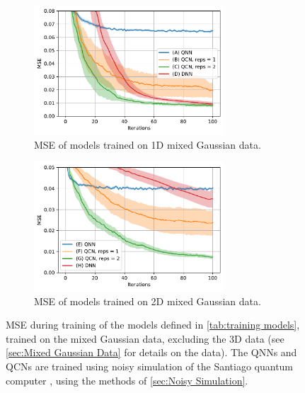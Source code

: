 \begin{figure}[H]
    \centering
    \begin{subfigure}[t]{0.45\textwidth}
        \centering
        \includegraphics[height=1.9in]{latex/figures/1D_gaussian_data_fit_noisy.pdf}
        \caption{MSE of models trained on 1D mixed Gaussian data.}
        
    \end{subfigure}%
    \hfill 
    \begin{subfigure}[t]{0.45\textwidth}
        \centering
        \includegraphics[height=1.9in]{latex/figures/2D_gaussian_data_fit_noisy.pdf}
        \caption{MSE of models trained on 2D mixed Gaussian data.}
    \end{subfigure}
    \caption{MSE during training of the models defined in \autoref{tab:training models}, trained on the mixed Gaussian data, excluding the 3D data (see \autoref{sec:Mixed Gaussian Data} for details on the data). The QNNs and QCNs are trained using noisy simulation of the Santiago quantum computer \cite{santiago}, using the methods of \autoref{sec:Noisy Simulation}.}
    \label{fig:trained noisy}
\end{figure}


